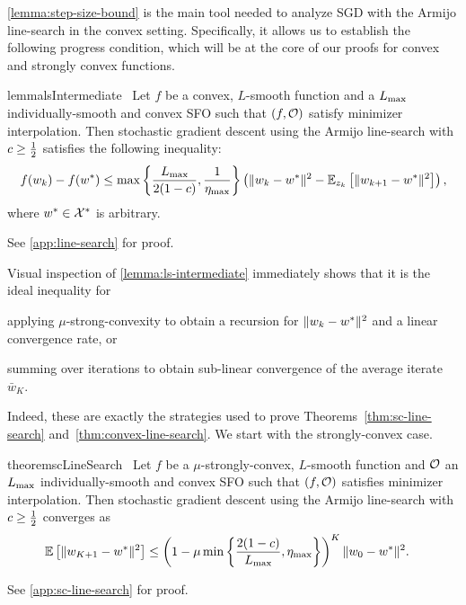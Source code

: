 \autoref{lemma:step-size-bound} is the main tool needed to analyze \ac{SGD} with the Armijo line-search in the convex setting.
Specifically, it allows us to establish the following progress condition, which will be at the core of our proofs for convex and strongly convex functions. 
\begin{restatable}{lemma}{lsIntermediate}~\label{lemma:ls-intermediate}
    Let \( f \) be a convex, \( L \)-smooth function and \oracle{} a \( \Lmax \) individually-smooth and convex \ac{SFO} such that \( \rbr{f, \oracle{}} \) satisfy minimizer interpolation.
    Then stochastic gradient descent using the Armijo line-search with \( c \geq \half \) satisfies the following
    inequality:
    \[ f(\wk)- f(\wopt) \leq \max\cbr{\frac{\Lmax}{2(1-c)},\inv{\etamax}} \rbr{\norm{\wk - \wopt}^2 - \E_{\zk}\sbr{\norm{\wkk - \wopt}^2}}, \]
    where \( \wopt \in \calX^* \) is arbitrary.
\end{restatable}
\noindent See \autoref{app:line-search} for proof. \hfill \break

Visual inspection of \autoref{lemma:ls-intermediate} immediately shows that it is the ideal inequality for 
\begin{inparaenum}[(a)]
    \item applying \( \mu \)-strong-convexity to obtain a recursion for \( \norm{\wk - \wopt}^2 \) and  a linear convergence rate, or
    \item summing over iterations to obtain sub-linear convergence of the average iterate \( \bar w_K \).
\end{inparaenum}
Indeed, these are exactly the strategies used to prove Theorems~\ref{thm:sc-line-search} and~\ref{thm:convex-line-search}.
We start with the strongly-convex case.

\begin{restatable}{theorem}{scLineSearch}~\label{thm:sc-line-search}
    Let \( f \) be a \( \mu \)-strongly-convex, \( L \)-smooth function and \( \oracle{} \) an \( \Lmax \) individually-smooth and convex \ac{SFO} such that \( \rbr{f, \oracle{}} \) satisfies minimizer interpolation.
    Then stochastic gradient descent using the Armijo line-search with \( c \geq \half \) converges as
    \begin{align*}
        \E\sbr{\norm{\w_{K+1} - \wopt}^2} &\leq \rbr{1 - \mu \min\cbr{\frac{2(1-c)}{\Lmax}, \etamax}}^K \norm{\w_0 - \wopt}^2. 
    \end{align*}
\end{restatable}%
\noindent See \autoref{app:sc-line-search} for proof. \hfill \break

